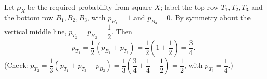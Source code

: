 Let $p_X$ be the required probability from square $X$; label the top row $T_1,T_2,T_3$ and the bottom row $B_1,B_2,B_3$, with $p_{B_1}=1$ and $p_{B_3}=0$. By symmetry about the vertical middle line, $p_{T_2}=p_{B_2}=\dfrac12$. Then
\[p_{T_1}=\dfrac12\left(p_{B_1}+p_{T_2}\right)=\dfrac12\left(1+\dfrac12\right)=\boxed{\dfrac34}.\]
(Check: $p_{T_2}=\dfrac13\left(p_{T_1}+p_{T_3}+p_{B_2}\right)=\dfrac13\left(\dfrac34+\dfrac14+\dfrac12\right)=\dfrac12$, with $p_{T_3}=\dfrac14$.)
